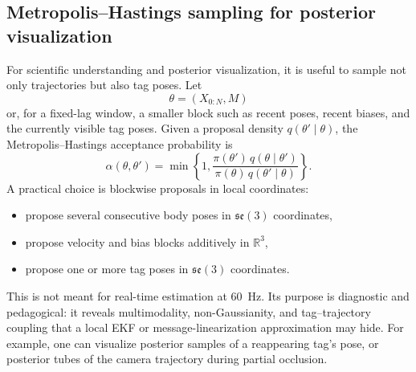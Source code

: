 \documentclass[11pt]{report}
\newcommand{\R}{\mathbb{R}}
\newcommand{\se}{\mathfrak{se}}
\begin{document}
\subsection{Metropolis--Hastings sampling for posterior visualization}
For scientific understanding and posterior visualization, it is useful to sample not only trajectories but also tag poses. Let
\[
\theta=(X_{0:N},M)
\]
or, for a fixed-lag window, a smaller block such as recent poses, recent biases, and the currently visible tag poses. Given a proposal density $q(\theta'\mid\theta)$, the Metropolis--Hastings acceptance probability is
\begin{equation}
\alpha(\theta,\theta')=
\min\left\{1,
\frac{\pi(\theta')\,q(\theta\mid\theta')}{\pi(\theta)\,q(\theta'\mid\theta)}
\right\}.
\label{eq:mh_acceptance_report}
\end{equation}
A practical choice is blockwise proposals in local coordinates:
\begin{itemize}
    \item propose several consecutive body poses in $\se(3)$ coordinates,
    \item propose velocity and bias blocks additively in $\R^3$,
    \item propose one or more tag poses in $\se(3)$ coordinates.
\end{itemize}
This is not meant for real-time estimation at 60~Hz. Its purpose is diagnostic and pedagogical: it reveals multimodality, non-Gaussianity, and tag--trajectory coupling that a local EKF or message-linearization approximation may hide. For example, one can visualize posterior samples of a reappearing tag's pose, or posterior tubes of the camera trajectory during partial occlusion.
\end{document}
